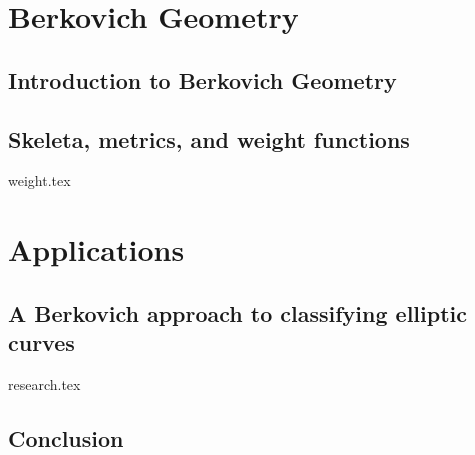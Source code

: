 \part{Berkovich Geometry}
\chapter{Introduction to Berkovich Geometry} \label{chap:intro_berkovich}


\chapter{Skeleta, metrics, and weight functions} \label{chap:weight_functions}
{weight.tex}

\part{Applications}
\chapter{A Berkovich approach to classifying elliptic curves} \label{chap:a_berkovich_approach_to_classifying_elliptic_curves}
{research.tex}

\chapter{Conclusion} \label{chap:conclusion}

\pagebreak
\printbibliography


